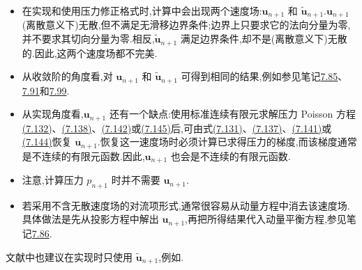 \begin{note}[关于 $\bm{u}_{n+1}$ 和 $\widetilde{\bm{u}}_{n+1}$]
\label{note:projection-velocity-fields}\label{note:projection-methods-later-remarks}
\begin{itemize}
 \item 在实现和使用压力修正格式时,计算中会出现两个速度场:$\bm{u}_{n+1}$ 和 $\widetilde{\bm{u}}_{n+1}$.$\bm{u}_{n+1}$(离散意义下)无散,但不满足无滑移边界条件;边界上只要求它的法向分量为零,并不要求其切向分量为零.相反,$\widetilde{\bm{u}}_{n+1}$ 满足边界条件,却不是(离散意义下)无散的.因此,这两个速度场都不完美.
 \item 从收敛阶的角度看,对 $\bm{u}_{n+1}$ 和 $\widetilde{\bm{u}}_{n+1}$ 可得到相同的结果,例如参见笔记\hyperref[note:nonincremental-pressure-correction-analysis]{7.85}、\hyperref[note:incremental-pressure-correction-cn-error]{7.91}和\hyperref[note:rotational-incremental-pressure-correction-error]{7.99}.
 \item 从实现角度看,$\bm{u}_{n+1}$ 还有一个缺点:使用标准连续有限元求解压力 Poisson 方程\hyperref[eq:nonincremental-pressure-poisson]{(7.132)}、\hyperref[eq:incremental-pressure-poisson-cn]{(7.138)}、\hyperref[eq:incremental-pressure-poisson-bdf2]{(7.142)}或\hyperref[eq:rotational-incremental-pressure-poisson]{(7.145)}后,可由式\hyperref[eq:nonincremental-pressure-correction-step]{(7.131)}、\hyperref[eq:incremental-pressure-correction-cn]{(7.137)}、\hyperref[eq:incremental-pressure-correction-bdf2-update]{(7.141)}或\hyperref[eq:rotational-incremental-pressure-correction]{(7.144)}恢复 $\bm{u}_{n+1}$.恢复这一速度场时必须计算已求得压力的梯度,而该梯度通常是不连续的有限元函数.因此,$\bm{u}_{n+1}$ 也会是不连续的有限元函数.
 \item 注意,计算压力 $p_{n+1}$ 时并不需要 $\bm{u}_{n+1}$.
 \item 若采用不含无散速度场的对流项形式,通常很容易从动量方程中消去该速度场.具体做法是先从投影方程中解出 $\bm{u}_{n+1}$,再把所得结果代入动量平衡方程,参见笔记\hyperref[note:nonincremental-pressure-correction-properties]{7.86}.
\end{itemize}
文献中也建议在实现时只使用 $\widetilde{\bm{u}}_{n+1}$,例如\textcite{Guermond2006}.
\end{note}

